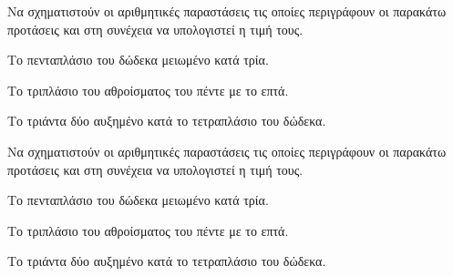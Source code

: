Να σχηματιστούν οι αριθμητικές παραστάσεις τις οποίες περιγράφουν οι παρακάτω προτάσεις και στη συνέχεια να υπολογιστεί η τιμή τους.
\begin{rlist}
\item Το πενταπλάσιο του δώδεκα μειωμένο κατά τρία.
\item Το τριπλάσιο του αθροίσματος του πέντε με το επτά.
\item Το τριάντα δύο αυξημένο κατά το τετραπλάσιο του δώδεκα.
\end{rlist}
Να σχηματιστούν οι αριθμητικές παραστάσεις τις οποίες περιγράφουν οι παρακάτω προτάσεις και στη συνέχεια να υπολογιστεί η τιμή τους.
\begin{rlist}
\item Το πενταπλάσιο του δώδεκα μειωμένο κατά τρία.
\item Το τριπλάσιο του αθροίσματος του πέντε με το επτά.
\item Το τριάντα δύο αυξημένο κατά το τετραπλάσιο του δώδεκα.
\end{rlist}
